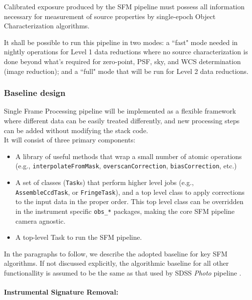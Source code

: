 \documentclass[12pt]{article}
\begin{document}
Calibrated exposure produced by the SFM pipeline must possess all information necessary for measurement of source properties by single-epoch Object Characterization algorithms.

It shall be possible to run this pipeline in two modes: a ``fast" mode needed in nightly operations for Level 1 data reductions where no source characterization is done beyond what's required for zero-point, PSF, sky, and WCS determination (image reduction); and a ``full" mode that will be run for Level 2 data reductions.

\subsubsection{Baseline design}

Single Frame Processing pipeline will be implemented as a flexible framework where different data can be easily treated differently, and new processing steps can be added without modifying the stack code.
\\

It will consist of three primary components:
%
\begin{itemize}
    \item A library of useful methods that wrap a small number of atomic operations (e.g., {\tt interpolateFromMask}, {\tt overscanCorrection}, {\tt biasCorrection}, etc.) %
    \item A set of classes ({\tt Task}s) that perform higher level jobs
    (e.g., {\tt AssembleCcdTask}, or {\tt FringeTask}), and a top level class to apply corrections to the input data in the proper order. This top level class can be overridden in the instrument specific {\tt obs\_*} packages, making the core SFM pipeline camera agnostic.
    \item A top-level Task to run the SFM pipeline.
\end{itemize}

In the paragraphs to follow, we describe the adopted baseline for key SFM algorithms. If not discussed explicitly, the algorithmic baseline for all other functionallity is assumed to be the same as that used by SDSS {\em Photo} pipeline \cite{LuptonPhoto}.

\paragraph{Instrumental Signature Removal:}
\end{document}
